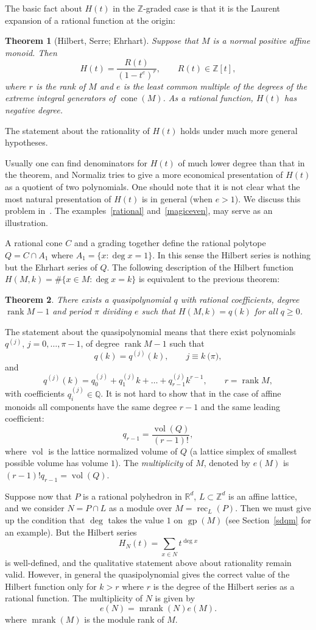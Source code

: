 \documentclass[12pt,a4paper]{scrartcl}
\newtheorem{theorem}{Theorem}
\theoremstyle{definition}
\def\ZZ{{\mathbb Z}}
\def\QQ{{\mathbb Q}}
\def\RR{{\mathbb R}}
\DeclareMathOperator{\gp}{gp}
\DeclareMathOperator{\rank}{rank}
\DeclareMathOperator{\cone}{cone}
\DeclareMathOperator{\rec}{rec}
\DeclareMathOperator{\mrank}{mrank}
\DeclareMathOperator{\vol}{vol}
\begin{document}
The basic fact about $H(t)$ in the $\ZZ$-graded case is that it
is the Laurent expansion of a rational function at the origin:
\begin{theorem}[Hilbert, Serre; Ehrhart]
	Suppose that $M$ is a normal positive affine monoid. Then
	$$
	H(t)=\frac{R(t)}{(1-t^e)^r},\qquad R(t)\in\ZZ[t], %
	$$
	where $r$ is the rank of $M$ and $e$ is the least common multiple
	of the degrees of the extreme integral generators of $\cone(M)$. As a rational function, $H(t)$ has negative degree.
\end{theorem}

The statement about the rationality of $H(t)$ holds under much more general hypotheses.

Usually one can find denominators for $H(t)$ of much lower
degree than that in the theorem, and Normaliz tries to
give a more economical presentation of $H(t)$ as a quotient of
two polynomials. One should note that it is not clear what the
most natural presentation of $H(t)$ is in general (when $e>1$).
We discuss this problem in~\cite[Section~4]{BIS}. The examples~\ref{rational} and~\ref{magiceven}, may serve as
an illustration.

A rational cone $C$ and a grading together define the rational
polytope $Q=C\cap A_1$ where $A_1=\{x:\deg x=1\}$. In this
sense the Hilbert series is nothing but the Ehrhart series of
$Q$.
The following description of the Hilbert function $H(M,k)=\#\{x\in M: \deg x=k\}$ is equivalent to the previous theorem:

\begin{theorem}
	There exists a quasipolynomial $q$ with rational coefficients, degree $\rank M-1$ and period $\pi$ dividing $e$ such that $H(M,k)=q(k)$ for all $q\ge0$.
\end{theorem}

The statement about the quasipolynomial means that there exist
polynomials $q^{(j)}$, $j=0,\dots,\pi-1$, of degree $\rank M-1$ such that
$$
q(k)=q^{(j)}(k),\qquad j\equiv k\pod \pi,
$$
and
$$
q^{(j)}(k)=q^{(j)}_0+q^{(j)}_1k+\dots+q^{(j)}_{r-1}k^{r-1},\qquad r=\rank M,
$$
with coefficients $q^{(j)}_i\in \QQ$. It is not hard to show that in the case of affine monoids all components have the same degree $r-1$ and the same leading coefficient:
$$
q_{r-1}=\frac{\vol(Q)}{(r-1)!},
$$
where $\vol$ is the lattice normalized volume of $Q$ (a lattice simplex of smallest possible volume has volume $1$). The \emph{multiplicity} of $M$, denoted by $e(M)$ is $(r-1)!q_{r-1}=\vol(Q)$.

Suppose now that $P$ is a rational polyhedron in $\RR^d$, $L\subset\ZZ^d$ is an affine lattice, and we consider $N=P\cap L$ as a module over $M=\rec_L(P)$. Then we must give up the condition that $\deg$ takes the value $1$ on $\gp(M)$ (see Section~\ref{sdqm} for an example). But the Hilbert series
$$
H_N(t)=\sum_{x\in N} t^{\deg x}
$$
is well-defined, and the qualitative statement above about rationality remain valid. However, in general the quasipolynomial gives the correct value of the Hilbert function only for $k>r$ where $r$ is the degree of the Hilbert series as a rational function. The multiplicity of $N$ is given by
$$
e(N)=\mrank(N)e(M).
$$
where $\mrank(M)$ is the module rank of $M$.
\end{document}

